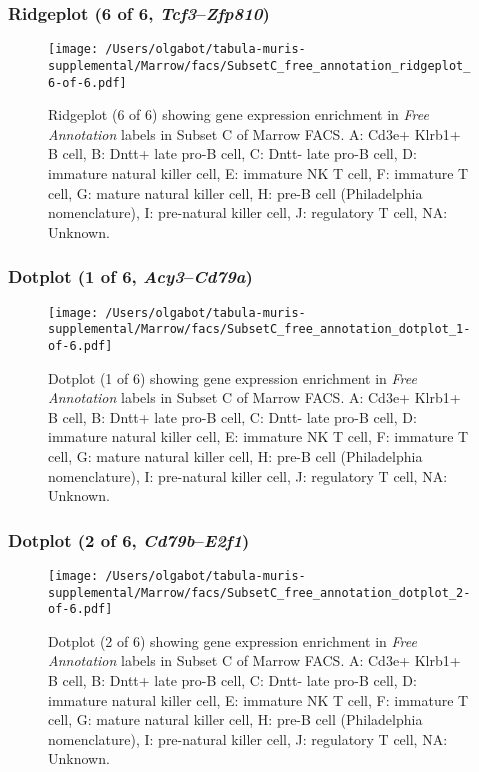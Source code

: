\clearpage

\subsubsection{Ridgeplot (6 of 6, \emph{Tcf3}--\emph{Zfp810})}
\begin{figure}[h]
\centering
\texttt{[image: /Users/olgabot/tabula-muris-supplemental/Marrow/facs/SubsetC\_free\_annotation\_ridgeplot\_6-of-6.pdf]}

\caption{ Ridgeplot (6 of 6)  showing gene expression enrichment in \emph{Free Annotation} labels in Subset C of Marrow FACS. A: Cd3e+ Klrb1+ B cell, B: Dntt+ late pro-B cell, C: Dntt- late pro-B cell, D: immature natural killer cell, E: immature NK T cell, F: immature T cell, G: mature natural killer cell, H: pre-B cell (Philadelphia nomenclature), I: pre-natural killer cell, J: regulatory T cell, NA: Unknown.}
\end{figure}


\clearpage

\subsubsection{Dotplot (1 of 6, \emph{Acy3}--\emph{Cd79a})}
\begin{figure}[h]
\centering
\texttt{[image: /Users/olgabot/tabula-muris-supplemental/Marrow/facs/SubsetC\_free\_annotation\_dotplot\_1-of-6.pdf]}

\caption{ Dotplot (1 of 6)  showing gene expression enrichment in \emph{Free Annotation} labels in Subset C of Marrow FACS. A: Cd3e+ Klrb1+ B cell, B: Dntt+ late pro-B cell, C: Dntt- late pro-B cell, D: immature natural killer cell, E: immature NK T cell, F: immature T cell, G: mature natural killer cell, H: pre-B cell (Philadelphia nomenclature), I: pre-natural killer cell, J: regulatory T cell, NA: Unknown.}
\end{figure}


\clearpage

\subsubsection{Dotplot (2 of 6, \emph{Cd79b}--\emph{E2f1})}
\begin{figure}[h]
\centering
\texttt{[image: /Users/olgabot/tabula-muris-supplemental/Marrow/facs/SubsetC\_free\_annotation\_dotplot\_2-of-6.pdf]}

\caption{ Dotplot (2 of 6)  showing gene expression enrichment in \emph{Free Annotation} labels in Subset C of Marrow FACS. A: Cd3e+ Klrb1+ B cell, B: Dntt+ late pro-B cell, C: Dntt- late pro-B cell, D: immature natural killer cell, E: immature NK T cell, F: immature T cell, G: mature natural killer cell, H: pre-B cell (Philadelphia nomenclature), I: pre-natural killer cell, J: regulatory T cell, NA: Unknown.}
\end{figure}


